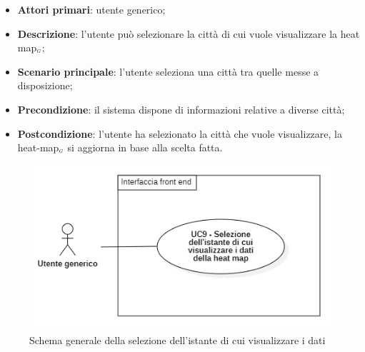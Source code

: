 \begin{itemize}
	\item \textbf{Attori primari}: utente generico;
	\item \textbf{Descrizione}: l’utente può selezionare la città di cui vuole visualizzare la heat map$_{\scaleto{G}{3pt}}$;
	\item \textbf{Scenario principale}: l’utente seleziona una città tra quelle messe a disposizione;
	\item \textbf{Precondizione}: il sistema dispone di informazioni relative a diverse città;
	\item \textbf{Postcondizione}:  l’utente ha selezionato la città che vuole visualizzare, la heat-map$_{\scaleto{G}{3pt}}$ si aggiorna in base alla scelta fatta.
\end{itemize}
\begin{center}
	\begin{figure}[H]
		\centering\includegraphics[scale=0.8]{../immagini/attori_casi/UC_9.png}
		\caption{Schema generale della selezione dell'istante di cui visualizzare i dati}
	\end{figure}
\end{center}
